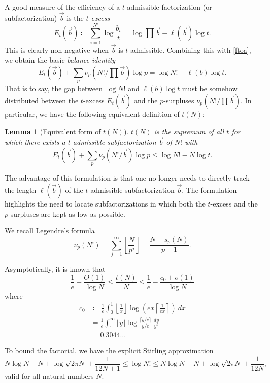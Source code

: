 \documentclass[12pt,a4paper,reqno]{amsart}
\numberwithin{equation}{section}
\theoremstyle{plain}
\newtheorem{lemma}[theorem]{Lemma}
\theoremstyle{definition}
\begin{document}
A good measure of the efficiency of a $t$-admissible factorization (or subfactorization) $\vec b$ is the \emph{$t$-excess}
$$ E_t(\vec b) \coloneqq \sum_{i=1}^{N'} \log \frac{b_i}{t}
= \log \prod \vec b - \ell(\vec b) \log t.$$
This is clearly non-negative when $\vec b$ is $t$-admissible.
Combining this with \eqref{ftoa}, we obtain the basic \emph{balance identity}
\begin{equation}\label{excess-identity}
E_t(\vec b) + \sum_p \nu_p(N!/\prod\vec b) \log p = \log N! - \ell(b) \log t.
\end{equation}
That is to say, the gap between $\log N!$ and $\ell(b) \log t$ must be somehow distributed between the $t$-excess $E_t(\vec b)$ and the $p$-surpluses $\nu_p(N!/\prod\vec b)$.  In particular, we have the following equivalent definition of $t(N)$:

\begin{lemma}[Equivalent form of $t(N)$]\label{balance} $t(N)$ is the supremum of all $t$ for which there exists a $t$-admissible subfactorization $\vec b$ of $N!$ with
$$  E_t(\vec b) + \sum_p \nu_p(N!/\vec b) \log p \leq \log N! - N \log t.$$
\end{lemma}

The advantage of this formulation is that one no longer needs to directly track the length $\ell(\vec b)$ of the $t$-admissible subfactorization $\vec b$.  The formulation  highlights the need to locate subfactorizations in which both the $t$-excess and the $p$-surpluses are kept as low as possible.


We recall Legendre's formula
\begin{equation}\label{legendre}
  \nu_p(N!) = \sum_{j=1}^\infty \left\lfloor \frac{N}{p^j} \right\rfloor = \frac{N - s_p(N)}{p-1}.
\end{equation}

Asymptotically, it is known that
$$ \frac{1}{e} - \frac{O(1)}{\log N} \leq \frac{t(N)}{N} \leq \frac{1}{e} - \frac{c_0+o(1)}{\log N}$$
where
  \begin{align*}
    c_0 &\coloneqq \frac{1}{e} \int_0^1 \left \lfloor \frac{1}{x} \right\rfloor \log \left( ex \left \lceil \frac{1}{ex} \right\rceil \right)\ dx \\
    &= \frac{1}{e} \int_1^\infty \lfloor y \rfloor \log \frac{\lceil y/e \rceil}{y/e}\ \frac{dy}{y^2} \\
    &= 0.3044\dots
  \end{align*}

To bound the factorial, we have the explicit Stirling approximation \cite{robbins}
\begin{equation}\label{stirling}
  N \log N - N + \log \sqrt{2\pi N} + \frac{1}{12N+1} \leq \log N! \leq N \log N - N + \log \sqrt{2\pi N} + \frac{1}{12N},
\end{equation}
valid for all natural numbers $N$. 
\end{document}
